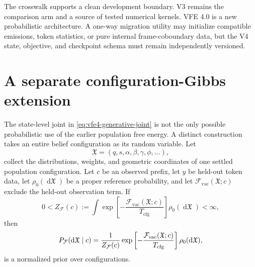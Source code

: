 The crosswalk supports a clean development boundary. V3 remains the comparison arm and a source of tested numerical kernels. VFE 4.0 is a new probabilistic architecture. A one-way migration utility may initialize compatible emissions, token statistics, or pure internal frame-coboundary data, but the V4 state, objective, and checkpoint schema must remain independently versioned.

\section{A separate configuration-Gibbs extension}

The state-level joint in \cref{eq:vfe4-generative-joint} is not the only possible probabilistic use of the earlier population free energy. A distinct construction takes an entire belief configuration as its random variable. Let
\begin{equation}
\mathfrak X
=
(q,s,\alpha,\beta,\gamma,\phi,\ldots),
\label{eq:configuration-gibbs-random-variable}
\end{equation}
collect the distributions, weights, and geometric coordinates of one settled population configuration. Let $c$ be an observed prefix, let $y$ be held-out token data, let $\rho_0(\mathop{\mathrm d\mathfrak X})$ be a proper reference probability, and let $\mathcal F_{\mathrm{vac}}(\mathfrak X;c)$ exclude the held-out observation term. If
\begin{equation}
0<Z_{\mathcal F}(c)
:=
\int
\exp\left[-\frac{\mathcal F_{\mathrm{vac}}(\mathfrak X;c)}{T_{\mathrm{cfg}}}\right]
\rho_0(\mathop{\mathrm d\mathfrak X})
<\infty,
\label{eq:configuration-gibbs-partition}
\end{equation}
then
\begin{equation}
P_{\mathcal F}(\mathop{\mathrm d\mathfrak X}\mid c)
=
\frac{1}{Z_{\mathcal F}(c)}
\exp\left[-\frac{\mathcal F_{\mathrm{vac}}(\mathfrak X;c)}{T_{\mathrm{cfg}}}\right]
\rho_0(\mathop{\mathrm d\mathfrak X}),
\label{eq:configuration-gibbs-prior}
\end{equation}
is a normalized prior over configurations.

